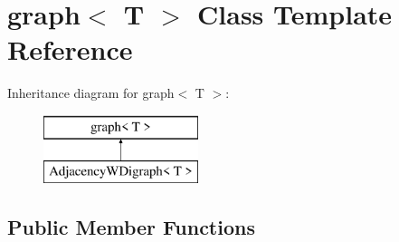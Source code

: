 \hypertarget{classgraph}{}\section{graph$<$ T $>$ Class Template Reference}
\label{classgraph}
Inheritance diagram for graph$<$ T $>$\+:\begin{figure}[H]
\begin{center}
\leavevmode
\includegraphics[height=2.000000cm]{classgraph}
\end{center}
\end{figure}
\subsection*{Public Member Functions}
